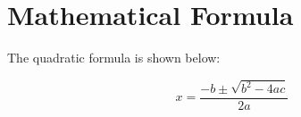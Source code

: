 \section{Mathematical Formula}
The quadratic formula is shown below:

\[
x = \frac{-b \pm \sqrt{b^2 - 4ac}}{2a}
\]
